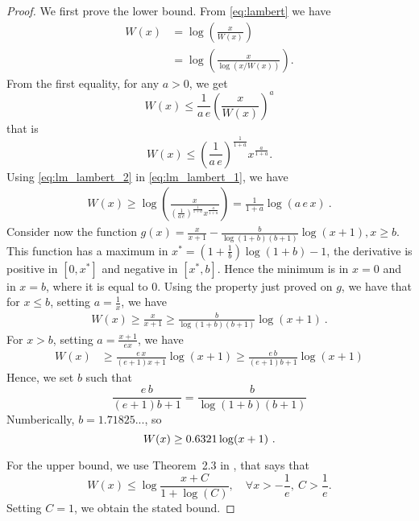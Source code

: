 \begin{proof}
We first prove the lower bound. From \eqref{eq:lambert} we have
\begin{align}
W(x) &= \log\left(\frac{x}{W(x)}\right) \label{eq:lm_lambert_1} \\
&= \log\left(\frac{x}{\log(x/W(x))}\right). \label{eq:lm_lambert_1b}
\end{align}
From the first equality, for any $a>0$, we get
\[
W(x) \leq \frac{1}{a\, e}\left(\frac{x}{W(x)}\right)^a
\]
that is
\begin{equation}
\label{eq:lm_lambert_2}
W(x) \leq \left(\frac{1}{a\, e}\right)^\frac{1}{1+a} x^\frac{a}{1+a}.
\end{equation}
Using \eqref{eq:lm_lambert_2} in \eqref{eq:lm_lambert_1}, we have
\begin{align*}
W(x) 
\geq \log\left(\frac{x}{\left(\frac{1}{a\, e}\right)^\frac{1}{1+a} x^\frac{a}{1+a}}\right) 
= \frac{1}{1+a}\log\left(a \, e\, x\right)~.
\end{align*}
Consider now the function $g(x)=\frac{x}{x+1} - \frac{b}{\log(1+b) (b+1)} \log(x+1), x\geq b$. This function has a maximum in $x^*=(1+\frac{1}{b}) \log(1+b)-1$, the derivative is positive in $[0,x^*]$ and negative in $[x^*,b]$. Hence the minimum is in $x=0$ and in $x=b$, where it is equal to $0$.
Using the property just proved on $g$, we have that for $x\leq b$, setting $a=\frac{1}{x}$, we have
\begin{align*}
W(x) 
\geq \frac{x}{x+1} \geq \frac{b}{\log(1+b) (b+1)} \log(x+1)~.
\end{align*}
For $x>b$, setting $a=\frac{x+1}{e x}$, we have
\begin{align}
W(x) 
&\geq \frac{e\,x}{(e+1) x + 1} \log(x+1) \geq \frac{e\,b}{(e+1) b + 1} \log(x+1)
\end{align}
Hence, we set $b$ such that 
\[
\frac{e\, b}{(e+1)b + 1} = \frac{b}{\log(1+b) (b+1)}
\]
Numberically, $b=1.71825...$, so
\[
W(x) \geq 0.6321 \log(x+1)~. \qedhere
\]

For the upper bound, we use Theorem~2.3 in \cite{hoorfar2008inequalities}, that says that
\[
W(x) \leq \log\frac{x+C}{1+\log(C)}, \quad \forall x> -\frac{1}{e}, \ C>\frac{1}{e}.
\]
Setting $C=1$, we obtain the stated bound.
\end{proof}

